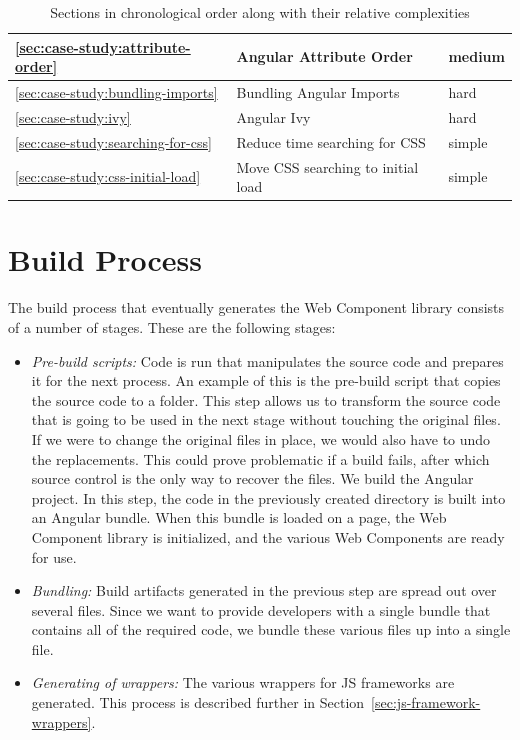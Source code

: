 \begin{table}[h]
\begin{tabularx}{\textwidth}{|l|X|l|}
    \ref{sec:case-study:attribute-order}        & Angular Attribute Order            & medium                       \\ \hline
    \ref{sec:case-study:bundling-imports}       & Bundling Angular Imports           & hard                         \\ \hline
    \ref{sec:case-study:ivy}                    & Angular Ivy                        & hard                         \\ \hline
    \ref{sec:case-study:searching-for-css}      & Reduce time searching for CSS      & simple                       \\ \hline
    \ref{sec:case-study:css-initial-load}       & Move CSS searching to initial load & simple                       \\
  \end{tabularx}
  \caption{Sections in chronological order along with their relative complexities}
  \label{tab:case-study:chronological-issues}
\end{table}

\section{Build Process}\label{sec:build-process}
The build process that eventually generates the Web Component library consists of a number of stages. These are the following stages:

\begin{itemize}
  \item \emph{Pre-build scripts:} Code is run that manipulates the source code and prepares it for the next process. An example of this is the pre-build script that copies the source code to a  folder. This step allows us to transform the source code that is going to be used in the next stage without touching the original files. If we were to change the original files in place, we would also have to undo the replacements. This could prove problematic if a build fails, after which source control is the only way to recover the files.
        We build the Angular project. In this step, the code in the previously created  directory is built into an Angular bundle. When this bundle is loaded on a page, the Web Component library is initialized, and the various Web Components are ready for use.  \item \emph{Bundling:} Build artifacts generated in the previous step are spread out over several files. Since we want to provide developers with a single bundle that contains all of the required code, we bundle these various files up into a single file.
  \item \emph{Generating of wrappers:} The various wrappers for JS frameworks are generated. This process is described further in Section~\ref{sec:js-framework-wrappers}.
\end{itemize}

